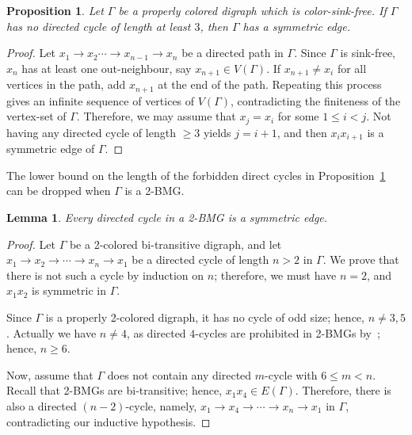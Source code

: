 \documentclass[final,3p,times]{elsarticle}
\newtheorem{proposition}[theorem]{Proposition}%
\newtheorem{lemma}[theorem]{Lemma}%
\begin{document}
\begin{proposition}
\label{prop:sink-free_sym}
Let $\Gamma$ be a properly colored digraph which is color-sink-free. If $\Gamma$ has no directed cycle of length at least $3$, then $\Gamma$ has a symmetric edge.
\end{proposition}
\begin{proof} 
Let $x_1\rightarrow x_2\cdots\rightarrow x_{n-1}\rightarrow x_n$ be a directed path in $\Gamma$. Since $\Gamma$ is sink-free, $x_n$ has at least one out-neighbour, say $x_{n+1}\in V(\Gamma)$. If $x_{n+1}\neq x_i$ for all vertices in the path, add $x_{n+1}$ at the end of the path. Repeating this process gives an infinite sequence of vertices of $V(\Gamma)$, contradicting the finiteness of the vertex-set of $\Gamma$. Therefore, we may assume that $x_j=x_i$ for some $1\leq i<j$. Not having any directed cycle of length $\ge 3$ yields $j=i+1$, and then $x_i x_{i+1}$ is a symmetric edge of $\Gamma$.
\end{proof}

The lower bound on the length of the forbidden direct cycles in Proposition~\ref{prop:sink-free_sym} can be dropped when $\Gamma$ is a 2-BMG.

\begin{lemma}
\label{lemma:2BMG-sym}
Every directed cycle in a 2-BMG is a symmetric edge.
\end{lemma}
\begin{proof}
Let $\Gamma$ be a 2-colored bi-transitive digraph, and let $x_1\rightarrow x_2\rightarrow \cdots \rightarrow x_{n} \rightarrow x_1$ be a directed cycle of length $n>2$ in $\Gamma$. We prove that there is not such a cycle by induction on $n$; therefore, we must have $n=2$, and $x_1x_2$ is symmetric in $\Gamma$.

Since $\Gamma$ is a properly 2-colored digraph, it has no cycle of odd size; hence, $n\neq3,5$. Actually we have $n\neq4$, as directed $4$-cycles are prohibited in 2-BMGs by~\cite[Corollary~3.6]{schaller2021complexity}; hence, $n\geq 6$.

Now, assume that $\Gamma$ does not contain any directed $m$-cycle with $6\leq m<n$. Recall that 2-BMGs are bi-transitive; hence, $x_1x_4\in E(\Gamma)$. Therefore, there is also a directed $(n-2)$-cycle, namely, $x_1\rightarrow x_4\rightarrow \cdots \rightarrow x_{n} \rightarrow x_1$ in $\Gamma$, contradicting our inductive hypothesis.
\end{proof}
\end{document}
